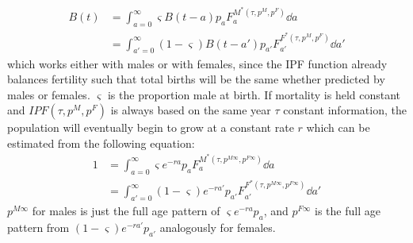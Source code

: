 \begin{align}
B(t) &= \int_{a=0}^\infty \varsigma B(t-a)p_aF_a^{M^\ast(\tau,p^M, p^F)}\dd a
\\ &= \int_{a'=0}^\infty (1-\varsigma) B(t-a')p_{a'}F_{a'}^{F^\ast(\tau,p^M,
p^F)}\dd a'
\end{align}
which works either with males or with females, since the IPF function already
balances fertility such that total births will be the same whether predicted by
males or females. $\varsigma$ is the proportion male at birth. If mortality is
held constant and $IPF(\tau,p^M, p^F)$ is always based on the same year $\tau$ 
constant information, the population will eventually begin
to grow at a constant rate $r$ which can be estimated from the following
equation:
\begin{align}
\label{eq:IPFtricky}
1 &= \int_{a=0}^\infty \varsigma e^{-ra}p_aF_a^{M^\ast(\tau,p^{M\infty},
p^{F\infty})}\dd a \\ 
&= \int_{a'=0}^\infty (1-\varsigma) e^{-ra'}p_{a'}F_{a'}^{F^\ast(\tau,p^{M\infty},
p^{F\infty})}\dd a'
\end{align}
$p^{M\infty}$ for males is just the full age pattern of
$\varsigma e^{-ra}p_a$, and $p^{F\infty}$ is the full age pattern
from $(1-\varsigma) e^{-ra'}p_{a'}$ analogously for females. 

